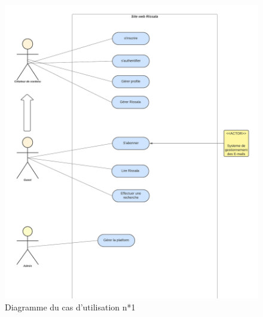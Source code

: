\begin{figure}[p]
    \centering
    \includegraphics[width=1.\textwidth,height=1.5\textheight,keepaspectratio]{image/Diagramme vierge.pdf}
    \caption{Diagramme du cas d'utilisation n*1}
    \label{fig:diagramme}
\end{figure}